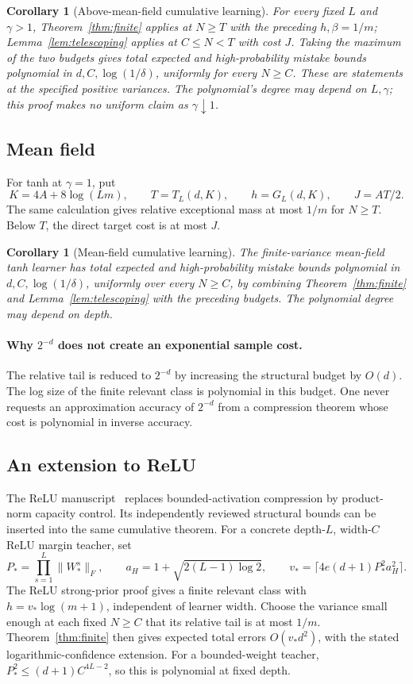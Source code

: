 \documentclass[11pt]{article}
\newtheorem{corollary}[theorem]{Corollary}
\theoremstyle{remark}\newtheorem{remark}[theorem]{Remark}
\begin{document}
\begin{corollary}[Above-mean-field cumulative learning]\label{cor:above}
For every fixed $L$ and $\gamma>1$, Theorem~\ref{thm:finite} applies
at $N\ge T$ with the preceding $h,\beta=1/m$;
Lemma~\ref{lem:telescoping} applies at $C\le N<T$ with cost $J$.
Taking the maximum of the two budgets gives total expected and
high-probability mistake bounds polynomial in $d,C,\log(1/\delta)$,
uniformly for every $N\ge C$. These are statements at the specified
positive variances. The polynomial's degree may depend on $L,\gamma$;
this proof makes no uniform claim as $\gamma\downarrow1$.
\end{corollary}

\subsection{Mean field}

For tanh at $\gamma=1$, put
\[
 K=4A+8\log(Lm),\qquad T=T_L(d,K),\qquad
 h=G_L(d,K),\qquad J=AT/2.
\]
The same calculation gives relative exceptional mass at most $1/m$ for
$N\ge T$. Below $T$, the direct target cost is at most $J$.

\begin{corollary}[Mean-field cumulative learning]\label{cor:meanfield}
The finite-variance mean-field tanh learner has total expected and
high-probability mistake bounds polynomial in $d,C,\log(1/\delta)$,
uniformly over every $N\ge C$, by combining Theorem~\ref{thm:finite}
and Lemma~\ref{lem:telescoping} with the preceding budgets.
The polynomial degree may depend on depth.
\end{corollary}

\paragraph{Why $2^{-d}$ does not create an exponential sample cost.}
The relative tail is reduced to $2^{-d}$ by increasing the structural
budget by $O(d)$. The log size of the finite relevant class is polynomial
in this budget. One never requests an approximation accuracy of $2^{-d}$
from a compression theorem whose cost is polynomial in inverse accuracy.

\subsection{An extension to ReLU}

The ReLU manuscript~\cite{relu} replaces bounded-activation compression by
product-norm capacity control. Its independently reviewed structural bounds
can be inserted into the same cumulative theorem. For a concrete
depth-$L$, width-$C$ ReLU margin teacher, set
\[
 P_* = \prod_{s=1}^L\|W_*^s\|_F,\qquad
 a_H=1+\sqrt{2(L-1)\log2},\qquad
 v_*=\lceil4e(d+1)P_*^2a_H^2\rceil.
\]
The ReLU strong-prior proof gives a finite relevant class with
$h=v_*\log(m+1)$, independent of learner width. Choose the variance small
enough at each fixed $N\ge C$ that its relative tail is at most $1/m$.
Theorem~\ref{thm:finite} then gives expected total errors $O(v_*d^2)$,
with the stated logarithmic-confidence extension. For a bounded-weight
teacher, $P_*^2\le(d+1)C^{4L-2}$, so this is polynomial at fixed depth.
\end{document}
